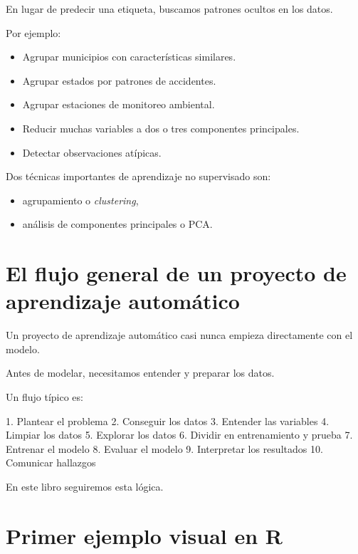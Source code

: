 \documentclass[
  11pt,
  letterpaper,
]{book}
\newenvironment{Shaded}{\begin{snugshade}}{\end{snugshade}}
\newcommand{\NormalTok}[1]{\textcolor[rgb]{0.00,0.23,0.31}{#1}}
\providecommand{\tightlist}{%
  \setlength{\itemsep}{0pt}\setlength{\parskip}{0pt}}
\begin{document}
En lugar de predecir una etiqueta, buscamos patrones ocultos en los
datos.

Por ejemplo:

\begin{itemize}
\tightlist
\item
  Agrupar municipios con características similares.
\item
  Agrupar estados por patrones de accidentes.
\item
  Agrupar estaciones de monitoreo ambiental.
\item
  Reducir muchas variables a dos o tres componentes principales.
\item
  Detectar observaciones atípicas.
\end{itemize}

Dos técnicas importantes de aprendizaje no supervisado son:

\begin{itemize}
\tightlist
\item
  agrupamiento o \emph{clustering},
\item
  análisis de componentes principales o PCA.
\end{itemize}

\section{El flujo general de un proyecto de aprendizaje
automático}\label{el-flujo-general-de-un-proyecto-de-aprendizaje-automuxe1tico}

Un proyecto de aprendizaje automático casi nunca empieza directamente
con el modelo.

Antes de modelar, necesitamos entender y preparar los datos.

Un flujo típico es:

\begin{Shaded}
\begin{Highlighting}[]
\NormalTok{1. Plantear el problema}
\NormalTok{2. Conseguir los datos}
\NormalTok{3. Entender las variables}
\NormalTok{4. Limpiar los datos}
\NormalTok{5. Explorar los datos}
\NormalTok{6. Dividir en entrenamiento y prueba}
\NormalTok{7. Entrenar el modelo}
\NormalTok{8. Evaluar el modelo}
\NormalTok{9. Interpretar los resultados}
\NormalTok{10. Comunicar hallazgos}
\end{Highlighting}
\end{Shaded}

En este libro seguiremos esta lógica.

\section{Primer ejemplo visual en R}\label{primer-ejemplo-visual-en-r}
\end{document}
